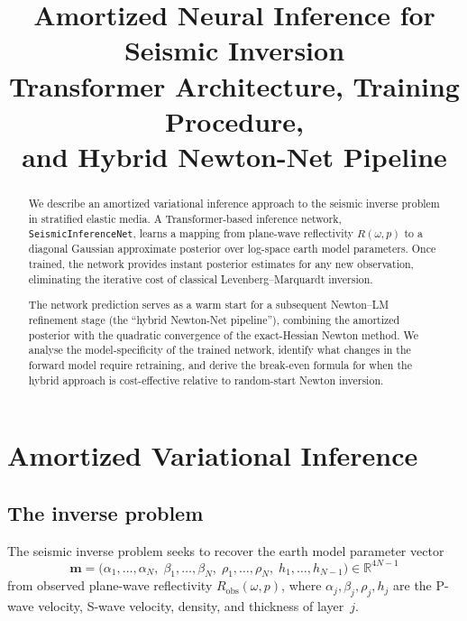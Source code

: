 \documentclass[11pt,a4paper]{article}
\title{%
  Amortized Neural Inference for Seismic Inversion\\[6pt]
  \large Transformer Architecture, Training Procedure,\\
  and Hybrid Newton-Net Pipeline%
}
\author{}
\date{}
\newcommand{\Robs}{R_{\mathrm{obs}}}
\theoremstyle{plain}
\theoremstyle{remark}
\begin{document}
\maketitle
\thispagestyle{fancy}

\begin{abstract}
We describe an amortized variational inference approach to the seismic
inverse problem in stratified elastic media.  A Transformer-based
inference network, \texttt{SeismicInferenceNet}, learns a mapping from
plane-wave reflectivity $R(\omega, p)$ to a diagonal Gaussian
approximate posterior over log-space earth model parameters.  Once
trained, the network provides instant posterior estimates for any new
observation, eliminating the iterative cost of classical
Levenberg--Marquardt inversion.

The network prediction serves as a warm start for a subsequent
Newton--LM refinement stage (the ``hybrid Newton-Net pipeline''),
combining the amortized posterior with the quadratic convergence of the
exact-Hessian Newton method.  We analyse the model-specificity of the
trained network, identify what changes in the forward model require
retraining, and derive the break-even formula for when the hybrid
approach is cost-effective relative to random-start Newton inversion.
\end{abstract}

\tableofcontents

\section{Amortized Variational Inference}\label{sec:amortized-vi}

\subsection{The inverse problem}

The seismic inverse problem seeks to recover the earth model parameter
vector
\begin{equation}\label{eq:params}
  \mathbf{m}
  = \bigl(\alpha_1,\dotsc,\alpha_N,\;
          \beta_1,\dotsc,\beta_N,\;
          \rho_1,\dotsc,\rho_N,\;
          h_1,\dotsc,h_{N-1}\bigr)
  \in \mathbb{R}^{4N-1}
\end{equation}
from observed plane-wave reflectivity $\Robs(\omega, p)$, where
$\alpha_j, \beta_j, \rho_j, h_j$ are the P-wave velocity, S-wave
velocity, density, and thickness of layer~$j$.
\end{document}
